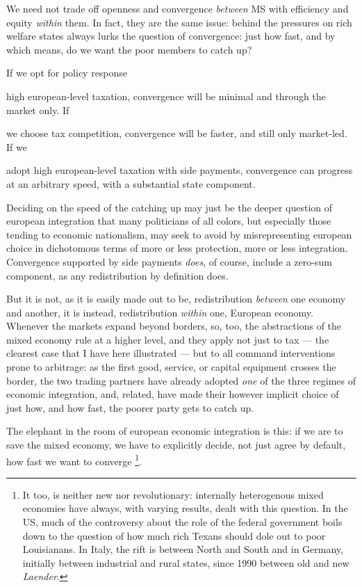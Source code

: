\documentclass[11pt,a4paper,oneside,openright]{article}
\begin{document}

We need not trade off openness and convergence \emph{between} \gls{MS} with efficiency and equity \emph{within} them. 
In fact, they are the same issue: 
behind the pressures on rich welfare states always lurks the question of convergence: 
just how fast, and by which means, do we want the poor members to catch up?

If we opt for policy response \begin{inparaenum} 
	\item high european-level taxation, convergence will be minimal and through the market only. 
	If \item we choose tax competition, convergence will be faster, and still only market-led. 
	If we \item adopt high european-level taxation with side payments, convergence can progress at an arbitrary speed, with a substantial state component. 
	\end{inparaenum}

Deciding on the speed of the catching up may just be the deeper question of european integration that many politicians of all colors, but especially those tending to economic nationalism, may seek to avoid by misrepresenting european choice in dichotomous terms of more or less protection, more or less integration. 
Convergence supported by side payments \emph{does}, of course, include a zero-sum component, as any redistribution by definition does. 

But it is not, as it is easily made out to be, redistribution \emph{between} one economy and another, it is instead, redistribution \emph{within} one, European economy. 
Whenever the markets expand beyond borders, so, too, the abstractions of the mixed economy rule at a higher level, and they apply not just to tax --- the clearest case that I have here illustrated --- but to all command interventions prone to arbitrage: 
as the first good, service, or capital equipment crosses the border, the two trading partners have already adopted \emph{one} of the three regimes of economic integration, and, related, have made their however implicit choice of just how, and how fast, the poorer party gets to catch up.

The elephant in the room of european economic integration is this: 
if we are to save the mixed economy, we have to explicitly decide, not just agree by default, how fast we want to converge
\footnote{
	It too, is neither new nor revolutionary: 
	internally heterogenous mixed economies have always, with varying results, dealt with this question. 
	In the US, much of the controversy about the role of the federal government boils down to the question of how much rich Texans should dole out to poor Louisianans. 
	In Italy, the rift is between North and South \citep[e.g.][]{PutnamLeonardi-1993-aa} and in Germany, initially between industrial and rural states, since 1990 between old and new \emph{Laender}.
}.
\end{document}
